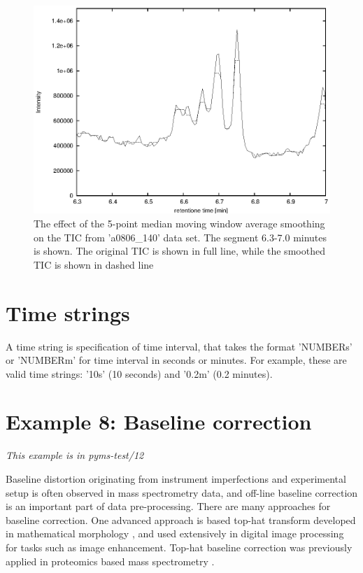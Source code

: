 \begin{figure}[htp]
\begin{center}
\includegraphics{graphics/pyms-test/tic_median_smoothed.eps}
\caption{The effect of the 5-point median moving window average smoothing
on the TIC from 'a0806\_140' data set. The segment 6.3-7.0 minutes is
shown. The original TIC is shown in full line, while the smoothed TIC
is shown in dashed line}
\label{fig:smoothed-median}
\end{center}
\end{figure}

\section{Time strings}
\label{sec:time-string}

A time string is specification of time interval, that takes the format
'NUMBERs' or 'NUMBERm' for time interval in seconds or minutes. For
example, these are valid time strings: '10s' (10 seconds) and '0.2m'
(0.2 minutes).

\section{\label{sec:baseline_correction}Example 8: Baseline correction}

\noindent
{\em This example is in pyms-test/12}

Baseline distortion originating from instrument imperfections and experimental
setup is often observed in mass spectrometry data, and off-line baseline correction
is an important part of data pre-processing. There are many approaches for
baseline correction. One advanced approach is based top-hat transform developed
in mathematical morphology \cite{serra83}, and used extensively in digital image
processing for tasks such as image enhancement.  Top-hat baseline correction was
previously applied in proteomics based mass spectrometry \cite{sauve04}.

